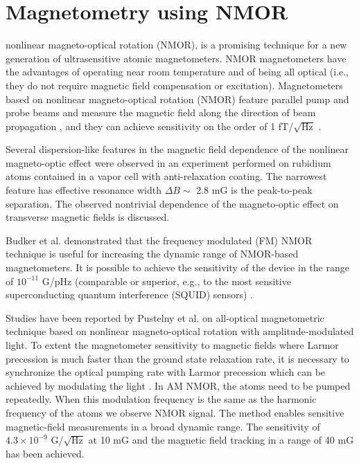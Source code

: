 \section{Magnetometry using NMOR\label{sec:magnetometry literature review}}

nonlinear magneto-optical rotation (NMOR), is a promising technique for a new generation of ultrasensitive atomic magnetometers. NMOR
magnetometers have the advantages of operating near room temperature and of being all optical
(i.e., they do not require magnetic field compensation or excitation). Magnetometers based on nonlinear
magneto-optical rotation (NMOR) feature parallel pump and probe beams and measure
the magnetic field along the direction of beam propagation \cite{bib:Budker2002} , and they can achieve sensitivity on the order of 1 fT/$\sqrt{\text{Hz}}$ \cite{bib:sensitivemagnetometry}. 
 
Several dispersion-like features in the magnetic field dependence of the nonlinear magneto-optic effect
were observed \cite{bib:UltranarrowWidths} in an experiment performed on rubidium atoms contained in a vapor cell with anti-relaxation
coating. The narrowest feature has effective resonance width $\Delta B \sim$ 2.8 mG is the
peak-to-peak separation. The observed nontrivial dependence of the magneto-optic effect on transverse
magnetic fields is discussed.

Budker et al. \cite{bib:FMNMOR} demonstrated that the frequency modulated (FM) NMOR technique is useful for increasing the dynamic range of NMOR-based magnetometers.  It is possible to achieve the  sensitivity of the device in the range of  $10^{−11} $ G/pHz (comparable or superior, e.g., to the most sensitive superconducting quantum interference (SQUID) sensors)  .

 Studies have been reported by  Pustelny et al.\cite{bib:AMNMOR,bib:amNMOR} on all-optical magnetometric technique based on nonlinear magneto-optical rotation with amplitude-modulated light. To extent the magnetometer sensitivity to magnetic fields where Larmor
precession is much faster than the ground state relaxation rate, it is
necessary to synchronize the optical pumping rate with Larmor
precession which can be achieved by modulating the light
\cite{doi:10.1063/1.3225917}. In AM NMOR, the atoms need to be pumped repeatedly. When this modulation frequency is the same as the harmonic
frequency of the atoms we observe NMOR signal. The method enables sensitive magnetic-field measurements in a broad dynamic range. The sensitivity of  $4.3\times10^{-9}$ G/$\sqrt{\text{Hz}}$ at 10 mG and the magnetic field tracking in a range of 40 mG has been achieved. 

